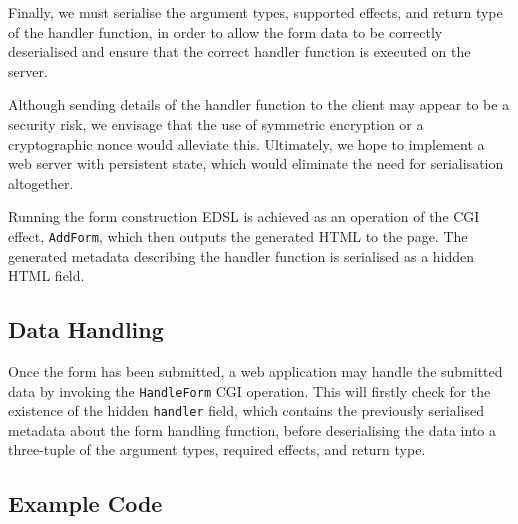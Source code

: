 \documentclass[preprint]{sigplanconf}
\begin{document}
%

Finally, we must serialise the argument types, supported effects, and return type of the handler function, in order to allow the form data to be correctly deserialised and ensure that the correct handler function is executed on the server. 

Although sending details of the handler function to the client may appear to be a security risk, we envisage that the use of symmetric encryption or a cryptographic nonce would alleviate this. Ultimately, we hope to implement a web server with persistent state, which would eliminate the need for serialisation altogether.

Running the form construction EDSL is achieved as an operation of the CGI effect, \texttt{AddForm}, which then outputs the generated HTML to the page. The generated metadata describing the handler function is serialised as a hidden HTML field.

\subsection{Data Handling}
Once the form has been submitted, a web application may handle the submitted data by invoking the \texttt{HandleForm} CGI operation. This will firstly check for the existence of the hidden \texttt{handler} field, which contains the previously serialised metadata about the form handling function, before deserialising the data into a three-tuple of the argument types, required effects, and return type.



\subsection{Example Code}
\end{document}
